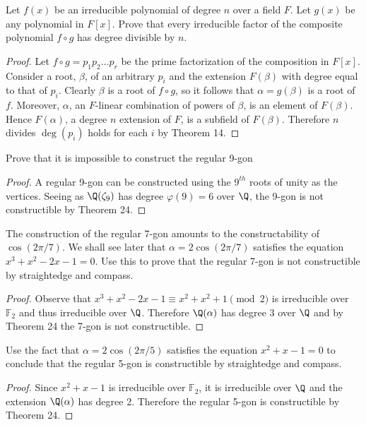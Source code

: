 \documentclass[10pt]{amsart}
\begin{document}
\begin{thm}
  \label{Ex5}
  \newcommand{\BB}{\mathcal{B}}
  Let $f(x)$ be an irreducible polynomial of degree $n$ over a field $F$.
  Let $g(x)$ be any polynomial in $F[x]$.
  Prove that every irreducible factor of the composite polynomial $f \circ g$ has degree divisible by $n$.
  \begin{proof}
    Let $f \circ g = p_1p_2\ldots p_r$ be the prime factorization of the composition in $F[x]$.
    Consider a root, $\beta$, of an arbitrary $p_i$ and the extension $F(\beta)$ with degree equal to that of $p_i$.
    Clearly $\beta$ is a root of $f \circ g$, so it follows that $\alpha = g(\beta)$ is a root of $f$.
    Moreover, $\alpha$, an $F$-linear combination of powers of $\beta$, is an element of $F(\beta)$.
    Hence $F(\alpha)$, a degree $n$ extension of $F$, is a subfield of $F(\beta)$.
    Therefore $n$ divides $\deg(p_i)$ holds for each $i$ by Theorem 14. 
  \end{proof}
\end{thm}

\begin{thm}
  \label{Ex6}
  Prove that it is impossible to construct the regular 9-gon
  \begin{proof}
    A regular 9-gon can be constructed using the $9^{th}$ roots of unity as the vertices.  
    Seeing as $\Q(\zeta_9)$ has degree $\varphi(9) = 6$ over $\Q$, the 9-gon is not constructible by Theorem 24.
  \end{proof}
  
  The construction of the regular 7-gon amounts to the constructability of $\cos(2\pi/7)$.  
  We shall see later that $\alpha = 2\cos(2\pi/7)$ satisfies the equation $x^3 + x^2 - 2x -1 = 0$.
  Use this to prove that the regular 7-gon is not constructible by straightedge and compass.
  
  \begin{proof}
    Observe that $x^3 + x^2 - 2x -1 \equiv x^2 + x^2 +1 \pmod{2}$ is irreducible over $\mathbb{F}_2$ and thus irreducible over $\Q$.
    Therefore $\Q(\alpha)$ has degree 3 over $\Q$ and by Theorem 24 the 7-gon is not constructible.
  \end{proof}

  Use the fact that $\alpha = 2 \cos(2\pi/5)$ satisfies the equation $x^2 + x - 1 = 0$ to conclude that the regular 5-gon is constructible by straightedge and compass.
  
  \begin{proof}
    Since $x^2 + x - 1$ is irreducible over $\mathbb{F}_2$, it is irreducible over $\Q$ and the extension $\Q(\alpha)$ has degree 2.
    Therefore the regular 5-gon is constructible by Theorem 24.
  \end{proof}
\end{thm}
\end{document}

